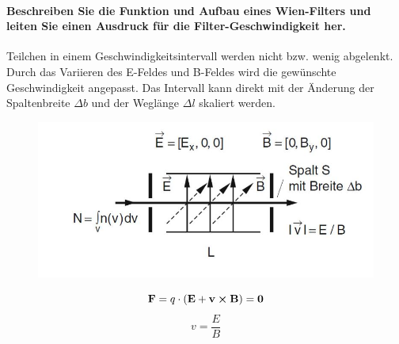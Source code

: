 \documentclass[a4paper, 11pt, ngerman, parskip=half-]{scrartcl}
\begin{document}
\paragraph{Beschreiben Sie die Funktion und Aufbau eines Wien-Filters und leiten Sie einen Ausdruck
    für die Filter-Geschwindigkeit her.}
Teilchen in einem Geschwindigkeitsintervall werden nicht bzw. wenig abgelenkt. Durch das Variieren des E-Feldes und B-Feldes wird die gewünschte
Geschwindigkeit angepasst. Das Intervall kann direkt mit der Änderung der Spaltenbreite $\varDelta b$ und der Weglänge $\varDelta l$ skaliert werden.
\begin{figure}[H]
    \includegraphics{image/05/5.7.JPG}
\end{figure}
\begin{equation}
    \vb{F} = q \cdot (\vb{E} + \vb{v} \cross \vb{B}) = \vb{0}
\end{equation}
%
\begin{equation}
    v = \frac{E}{B}
\end{equation}
\end{document}
